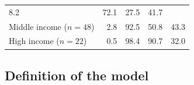 \documentclass[11pt,a4paper,openany]{book}
\begin{document}
\begin{longtable}[]{@{}lrrrr@{}}
\begin{minipage}[t]{0.20\columnwidth}
8.2\strut
\end{minipage} & \begin{minipage}[t]{0.07\columnwidth}\raggedleft\strut
72.1\strut
\end{minipage} & \begin{minipage}[t]{0.08\columnwidth}\raggedleft\strut
27.5\strut
\end{minipage} & \begin{minipage}[t]{0.08\columnwidth}\raggedleft\strut
41.7\strut
\end{minipage}\tabularnewline
\begin{minipage}[t]{0.41\columnwidth}\raggedright\strut
Middle income (\(n=48\))\strut
\end{minipage} & \begin{minipage}[t]{0.20\columnwidth}\raggedleft\strut
2.8\strut
\end{minipage} & \begin{minipage}[t]{0.07\columnwidth}\raggedleft\strut
92.5\strut
\end{minipage} & \begin{minipage}[t]{0.08\columnwidth}\raggedleft\strut
50.8\strut
\end{minipage} & \begin{minipage}[t]{0.08\columnwidth}\raggedleft\strut
43.3\strut
\end{minipage}\tabularnewline
\begin{minipage}[t]{0.41\columnwidth}\raggedright\strut
High income (\(n=22\))\strut
\end{minipage} & \begin{minipage}[t]{0.20\columnwidth}\raggedleft\strut
0.5\strut
\end{minipage} & \begin{minipage}[t]{0.07\columnwidth}\raggedleft\strut
98.4\strut
\end{minipage} & \begin{minipage}[t]{0.08\columnwidth}\raggedleft\strut
90.7\strut
\end{minipage} & \begin{minipage}[t]{0.08\columnwidth}\raggedleft\strut
32.0\strut
\end{minipage}\tabularnewline
\bottomrule
\end{longtable}

\subsection{Definition of the model}\label{ss-regression-simple-def}
\end{document}
